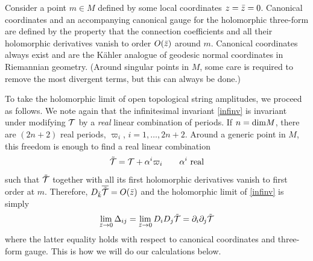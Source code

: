 Consider a point $m\in M$ defined by some local coordinates $z={\bar z}=0$.
Canonical coordinates and an accompanying canonical gauge for the 
holomorphic three-form \cite{bcov2} are defined by the property that
the connection coefficients and all their holomorphic derivatives
vanish to order $O({\bar z})$ around $m$. Canonical coordinates always
exist and are the K\"ahler analogue of geodesic normal coordinates
in Riemannian geometry. (Around singular points in $M$, some care is
required to remove the most divergent terms, but this can always be 
done.)

To take the holomorphic limit of open topological string amplitudes,
we proceed as follows. We note again that the infinitesimal invariant
\eqref{infinv} is invariant under modifying ${\cal T}$ by a {\it real}
linear combination of periods. If $n={\rm dim}M$, there are $(2n+2)$
real periods, $\varpi_i$, $i=1,\ldots ,2n+2$. Around a generic point 
in $M$, this freedom is enough to find a real linear combination
\begin{equation}
\tilde{{\cal T}} = {\cal T} + \alpha^i\varpi_i \qquad \text{$\alpha^i$ real}
\end{equation}
such that $\tilde{{\cal T}}$ together with all its first holomorphic 
derivatives vanish to first order at $m$. Therefore, 
$D_{\bar k}\overline{\tilde{{\cal T}}}=O({\bar z})$ and the holomorphic limit
of \eqref{infinv} is simply
\begin{equation}
\eqlabel{simply}
\lim_{\zb\to 0} \Delta_{ij} =\lim_{\zb\to 0} D_i D_j \tilde\calt 
= \del_i\del_j \tilde\calt
\end{equation}
where the latter equality holds with respect to canonical coordinates
and three-form gauge. This is how we will do our calculations below.

